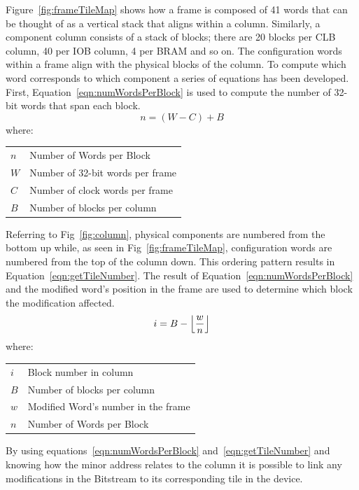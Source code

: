 \documentclass[journal, hidelinks]{IEEEtran}
\makeatletter
\newenvironment{conditions}
{\par\vspace{\abovedisplayskip}\noindent\begin{tabular}{>{$}l<{$} @{${}={}$} l}}
	{\end{tabular}\par\vspace{\belowdisplayskip}}
\makeatother
\begin{document}
Figure~\ref{fig:frameTileMap} shows how a frame is composed of 41 words that can be thought of as a vertical stack that aligns within a column.
Similarly, a component column consists of a stack of blocks; there are 20 blocks per CLB column, 40 per IOB column, 4 per BRAM and so on.
The configuration words within a frame align with the physical blocks of the column.
To compute which word corresponds to which component a series of equations has been developed.
First, Equation~\ref{eqn:numWordsPerBlock} is used to compute the number of 32-bit words that span each block.
\begin{equation} \label{eqn:numWordsPerBlock}
n = (W - C) + B
\end{equation}
where:
\begin{conditions}
	n     &  Number of Words per Block \\
	W     &  Number of 32-bit words per frame \\   
	C     &  Number of clock words per frame \\
	B     &  Number of blocks per column
\end{conditions}
Referring to Fig~\ref{fig:column}, physical components are numbered from the bottom up while, as seen in Fig~\ref{fig:frameTileMap}, configuration words are numbered from the top of the column down.
This ordering pattern results in Equation~\ref{eqn:getTileNumber}.
The result of Equation~\ref{eqn:numWordsPerBlock} and the modified word's position in the frame are used to determine which block the modification affected.
\begin{equation} \label{eqn:getTileNumber}
i = B - \floor*{\frac{w}{n}}
\end{equation}
where:
\begin{conditions}
	i     &  Block number in column\\
	B     &  Number of blocks per column \\
	w     &  Modified Word's number in the frame\\
	n     &  Number of Words per Block 
\end{conditions}
By using equations~\ref{eqn:numWordsPerBlock} and~\ref{eqn:getTileNumber} and knowing how the minor address relates to the column it is possible to link any modifications in the Bitstream to its corresponding tile in the device.

\end{document}
